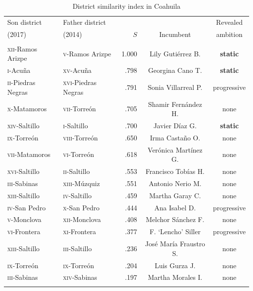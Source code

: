 \documentclass[letter,12pt]{article}
\begin{document}
\begin{table}
  \centering
\begin{tabular}{llrcc}
 Son district                &  Father district            &       &                        & Revealed          \\ [-.5ex]
 (2017)                      &  (2014)                     &  $S$  & Incumbent              & ambition          \\ \hline
\\ [-1.2ex]
 \textsc{xii}-Ramos Arizpe   & \textsc{v}-Ramos Arizpe     & 1.000 & Lily Gutiérrez B.      & \textbf{static}   \\
 \textsc{i}-Acuña            & \textsc{xv}-Acuña           &  .798 & Georgina Cano T.       & \textbf{static}   \\ 
 \textsc{ii}-Piedras Negras  & \textsc{xvi}-Piedras Negras &  .791 & Sonia Villarreal P.    & progressive       \\ 
 \textsc{x}-Matamoros        & \textsc{vii}-Torreón        &  .705 & Shamir Fernández H.    & none              \\ 
 \textsc{xiv}-Saltillo       & \textsc{i}-Saltillo         &  .700 & Javier Díaz G.         & \textbf{static}   \\ 
 \textsc{ix}-Torreón         & \textsc{viii}-Torreón       &  .650 & Irma Castaño O.        & none              \\ 
 \textsc{vii}-Matamoros      & \textsc{vi}-Torreón         &  .618 & Verónica Martínez G.   & none              \\ 
 \textsc{xvi}-Saltillo       & \textsc{ii}-Saltillo        &  .553 & Francisco Tobías H.    & none              \\ 
 \textsc{iii}-Sabinas        & \textsc{xiii}-Múzquiz       &  .551 & Antonio Nerio M.       & none              \\ 
 \textsc{xiii}-Saltillo      & \textsc{iv}-Saltillo        &  .459 & Martha Garay C.        & none              \\ 
 \textsc{iv}-San Pedro       & \textsc{x}-San Pedro        &  .444 & Ana Isabel D.          & progressive       \\ 
 \textsc{v}-Monclova         & \textsc{xii}-Monclova       &  .408 & Melchor Sánchez F.     & none              \\ 
 \textsc{vi}-Frontera        & \textsc{xi}-Frontera        &  .377 & F. `Lencho' Siller     & progressive       \\ 
 \textsc{xiii}-Saltillo      & \textsc{iii}-Saltillo       &  .236 & José María Fraustro S. & none              \\ 
 \textsc{ix}-Torreón         & \textsc{ix}-Torreón         &  .204 & Luis Gurza J.          & none              \\ 
 \textsc{iii}-Sabinas        & \textsc{xiv}-Sabinas        &  .197 & Martha Morales I.      & none              \\ 
 \\ [-1.2ex] \hline
\end{tabular}
\caption{District similarity index in Coahuila}\label{T:dsi}
\end{table}
\end{document}

